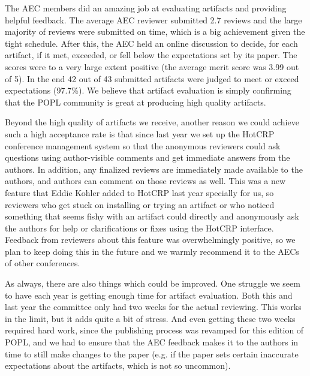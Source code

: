 
%
The AEC members did an amazing job at evaluating artifacts and
providing helpful feedback.
%
The average AEC reviewer submitted 2.7 reviews and the large majority
of reviews were submitted on time, which is a big achievement given
the tight schedule.
%
After this, the AEC held an online discussion to decide, for each
artifact, if it met, exceeded, or fell below the expectations set by
its paper.
%
The scores were to a very large extent positive (the average merit
score was 3.99 out of 5).
%
In the end 42 out of 43 submitted artifacts were judged to meet or
exceed expectations (97.7\%).
%
We believe that artifact evaluation is simply confirming that the POPL
community is great at producing high quality artifacts.

Beyond the high quality of artifacts we receive, another reason we could
achieve such a high acceptance rate is that since last year we set up
the HotCRP conference management system so that the anonymous
reviewers could ask questions using author-visible comments and get
immediate answers from the authors. In addition, any finalized reviews
are immediately made available to the authors, and authors can comment
on those reviews as well. This was a new feature that Eddie Kohler
added to HotCRP last year specially for us, so reviewers who get stuck
on installing or trying an artifact or who noticed something that
seems fishy with an artifact could directly and anonymously ask the
authors for help or clarifications or fixes using the HotCRP
interface. Feedback from reviewers about this feature was
overwhelmingly positive, so we plan to keep doing this in the
future and we warmly recommend it to the AECs of other conferences.

As always, there are also things which could be improved. One struggle we
seem to have each year is getting enough time for artifact
evaluation. Both this and last year the committee only had two weeks
for the actual reviewing. This works in the limit, but it adds quite a
bit of stress. And even getting these two weeks required hard work,
since the publishing process was revamped for this edition of POPL,
and we had to ensure that the AEC feedback makes it to the authors in
time to still make changes to the paper (e.g. if the paper sets
certain inaccurate expectations about the artifacts, which is not so uncommon).

